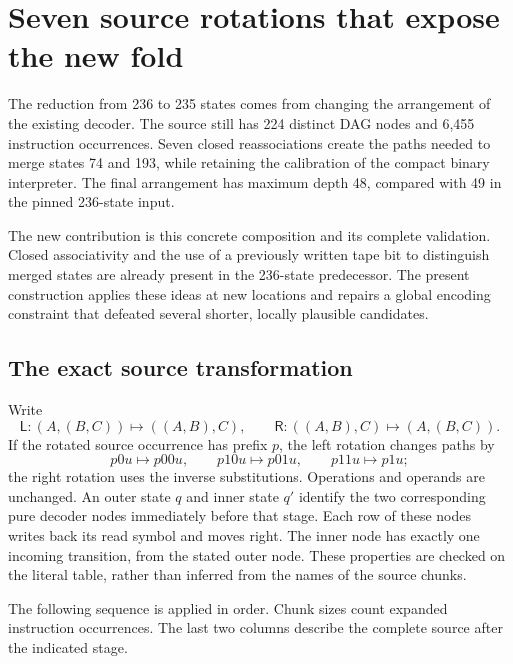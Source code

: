 \section{Seven source rotations that expose the new fold}
\label{sec:seven-source-rotations235}

The reduction from 236 to 235 states comes from changing the arrangement of
the existing decoder.  The source still has 224 distinct DAG nodes and
6,455 instruction occurrences.  Seven closed reassociations create the
paths needed to merge states 74 and 193, while retaining the calibration
of the compact binary interpreter.  The final arrangement has maximum
depth 48, compared with 49 in the pinned 236-state input.

The new contribution is this concrete composition and its complete
validation.  Closed associativity and the use of a previously written
tape bit to distinguish merged states are already present in the
236-state predecessor.  The present construction applies these ideas
at new locations and repairs a global encoding constraint that defeated
several shorter, locally plausible candidates.

\subsection{The exact source transformation}

Write
\[
 \mathsf L:(A,(B,C))\longmapsto((A,B),C),\qquad
 \mathsf R:((A,B),C)\longmapsto(A,(B,C)).
\]
If the rotated source occurrence has prefix $p$, the left rotation changes
paths by
\[
 p0u\mapsto p00u,\qquad
 p10u\mapsto p01u,\qquad
 p11u\mapsto p1u;
\]
the right rotation uses the inverse substitutions.  Operations and
operands are unchanged.  An outer state $q$ and inner state $q'$ identify
the two corresponding pure decoder nodes immediately before that stage.
Each row of these nodes writes back its read symbol and moves right.
The inner node has exactly one incoming transition, from the stated
outer node.  These properties are checked on the literal table, rather
than inferred from the names of the source chunks.

The following sequence is applied in order.  Chunk sizes count expanded
instruction occurrences.  The last two columns describe the complete
source after the indicated stage.

